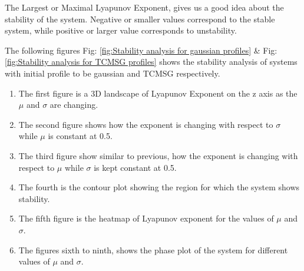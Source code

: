 The Largest or Maximal Lyapunov Exponent, gives us a good idea about the stability of the system. Negative or smaller values 
correspond to the stable system, while positive or larger value corresponds to unstability.


The following figures Fig: \ref{fig:Stability analysis for gaussian profiles} \& Fig: \ref{fig:Stability analysis for TCMSG profiles} 
shows the stability analysis of systems with initial profile to be gaussian and TCMSG respectively.
\begin{enumerate}
    \item The first figure is a 3D landscape of Lyapunov Exponent on the z axis as the $\mu$ and $\sigma$ are changing.
    \item The second figure shows how the exponent is changing with respect to $\sigma$ while $\mu$ is constant at 0.5.
    \item The third figure show similar to previous, how the exponent is changing with respect to $\mu$ while $\sigma$ is kept constant at 0.5.
    \item The fourth is the contour plot showing the region for which the system shows stability.
    \item The fifth figure is the heatmap of Lyapunov exponent for the values of $\mu$ and $\sigma$.
    \item The figures sixth to ninth, shows the phase plot of the system for different values of $\mu$ and $\sigma$.
\end{enumerate}


